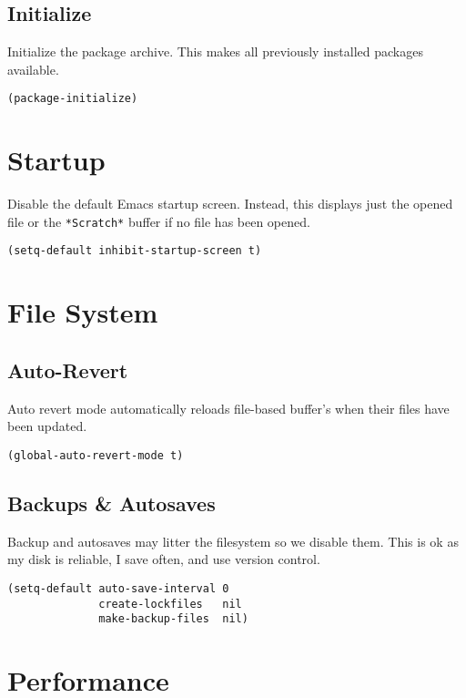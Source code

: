 \documentclass[11pt]{article}
\begin{document}
\subsection{Initialize}
\label{sec:org2165807}

Initialize the package archive. This makes all previously installed packages available.

\begin{verbatim}
(package-initialize)
\end{verbatim}
\section{Startup}
\label{sec:orgf92848c}

Disable the default Emacs startup screen. Instead, this displays just the opened
file or the \texttt{*Scratch*} buffer if no file has been opened.

\begin{verbatim}
(setq-default inhibit-startup-screen t)
\end{verbatim}
\section{File System}
\label{sec:orgadf2d71}

\subsection{Auto-Revert}
\label{sec:org607b3ad}

Auto revert mode automatically reloads file-based buffer's when their files have
been updated.

\begin{verbatim}
(global-auto-revert-mode t)
\end{verbatim}
\subsection{Backups \& Autosaves}
\label{sec:orgaab9483}

Backup and autosaves may litter the filesystem so we disable
them. This is ok as my disk is reliable, I save often, and use version
control.

\begin{verbatim}
(setq-default auto-save-interval 0
              create-lockfiles   nil
              make-backup-files  nil)
\end{verbatim}
\section{Performance}
\label{sec:orgea78980}
\end{document}
